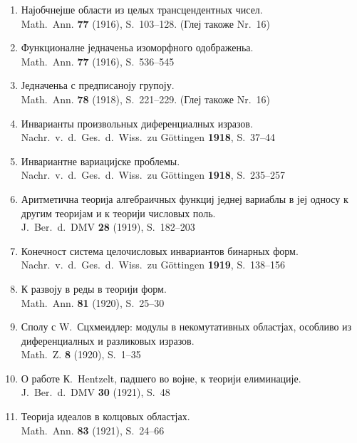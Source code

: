 ﻿\documentclass[11pt]{article}
\newcommand{\foreign}[1]{#1}
\begin{document}
\begin{enumerate}[label={\small\arabic*.},leftmargin=2em,itemsep=0.3em]
\item Најобчнејше области из целых трансцендентных чисел.\\
\foreign{Math.\ Ann.} \textbf{77} (1916), S.~103--128. (Глеј такоже Nr.~16)

\item Функционалне једначеньа изоморфного одображеньа.\\
\foreign{Math.\ Ann.} \textbf{77} (1916), S.~536--545

\item Једначеньа с предписаноју групоју.\\
\foreign{Math.\ Ann.} \textbf{78} (1918), S.~221--229. (Глеј такоже Nr.~16)

\item Инварианты произвольных диференциалных изразов.\\
\foreign{Nachr.\ v.\ d.\ Ges.\ d.\ Wiss.\ zu Göttingen} \textbf{1918}, S.~37--44

\item Инвариантне вариацијске проблемы.\\
\foreign{Nachr.\ v.\ d.\ Ges.\ d.\ Wiss.\ zu Göttingen} \textbf{1918}, S.~235--257

\item Аритметична теорија алгебраичных функциј једнеј вариаблы в јеј односу к другим теоријам и к теорији числовых поль.\\
\foreign{J.\ Ber.\ d.\ DMV} \textbf{28} (1919), S.~182--203

\item Конечност система целочисловых инвариантов бинарных форм.\\
\foreign{Nachr.\ v.\ d.\ Ges.\ d.\ Wiss.\ zu Göttingen} \textbf{1919}, S.~138--156

\item К развоју в реды в теорији форм.\\
\foreign{Math.\ Ann.} \textbf{81} (1920), S.~25--30

\item Сполу с W.\ Сцхмеидлер: модулы в некомутативных областјах, особливо из диференциалных и разликовых изразов.\\
\foreign{Math.\ Z.} \textbf{8} (1920), S.~1--35

\item О работе К.\ Hentzelt, падшего во војне, к теорији елиминације.\\
\foreign{J.\ Ber.\ d.\ DMV} \textbf{30} (1921), S.~48

\item Теорија идеалов в колцовых областјах.\\
\foreign{Math.\ Ann.} \textbf{83} (1921), S.~24--66


\end{enumerate}
\end{document}
